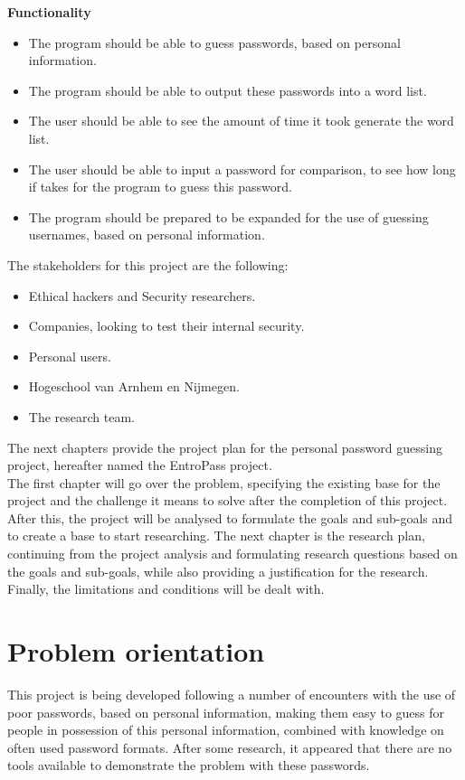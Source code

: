 \documentclass[a4paper,12pt]{article}
\begin{document}
\textbf{Functionality}
\begin{itemize}
\item The program should be able to guess passwords, based on personal information.
\item The program should be able to output these passwords into a word list.
\item The user should be able to see the amount of time it took generate the word list.
\item The user should be able to input a password for comparison, to see how long if takes for the program to guess this password.
\item The program should be prepared to be expanded for the use of guessing usernames, based on personal information.
\end{itemize}

The stakeholders for this project are the following:
\begin{itemize}
\item Ethical hackers and Security researchers.
\item Companies, looking to test their internal security.
\item Personal users.
\item Hogeschool van Arnhem en Nijmegen.
\item The research team.
\end{itemize}

The next chapters provide the project plan for the personal password guessing project, hereafter named the EntroPass project.\\

The first chapter will go over the problem, specifying the existing base for the project and the challenge it means to solve after the completion of this project. After this, the project will be analysed to formulate the goals and sub-goals and to create a base to start researching. The next chapter is the research plan, continuing from the project analysis and formulating research questions based on the goals and sub-goals, while also providing a justification for the research. Finally, the limitations and conditions will be dealt with.

\newpage
\section{Problem orientation}
This project is being developed following a number of encounters with the use of poor passwords, based on personal information, making them easy to guess for people in possession of this personal information, combined with knowledge on often used password formats.
After some research, it appeared that there are no tools available to demonstrate the problem with these passwords.\\
\end{document}
